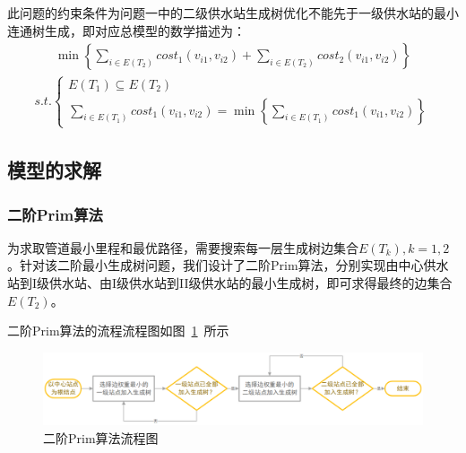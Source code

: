 \documentclass{whutmod}
\begin{document}
			此问题的约束条件为问题一中的二级供水站生成树优化不能先于一级供水站的最小连通树生成，即对应总模型的数学描述为：
			\begin{gather}
			\min \left\{ \sum_{i\in E(T_2) }cost_1(v_{i1},v_{i2})+\sum_{i\in E(T_2) }cost_2(v_{i1},v_{i2}) \right \}
			\end{gather}
			\begin{gather*}
			s.t.\left\{\begin{matrix}
			E(T_{1})\subseteq  E(T_{2})\\ 
				\sum_{i\in E(T_1) }cost_1(v_{i1},v_{i2})=\min\left \{ 	\sum_{i\in E(T_1) }cost_1(v_{i1},v_{i2}) \right \} 
						\end{matrix}\right.
			\end{gather*}
		\subsection{模型的求解}
			\subsubsection{二阶Prim算法}
		为求取管道最小里程和最优路径，需要搜索每一层生成树边集合$E(T_k),k=1,2$。针对该二阶最小生成树问题，我们设计了二阶Prim算法，分别实现由中心供水站到I级供水站、由I级供水站到II级供水站的最小生成树，即可求得最终的边集合$E(T_2)$。
		
		二阶Prim算法的流程流程图如图~\ref{asd}~所示
		\begin{figure}[H]
		\centering
		\includegraphics[width=\textwidth]{figures/a1.png}
		\caption{二阶Prim算法流程图}\label{asd}
	\end{figure}
		
\end{document}
